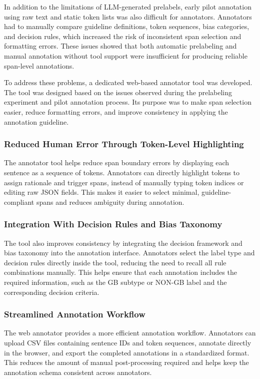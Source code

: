 \documentclass[12pt,oneside,openright,a4paper]{cpe-english-project}
\begin{document}
In addition to the limitations of LLM-generated prelabels, early pilot annotation using raw text and static token lists was also difficult for annotators. Annotators had to manually compare guideline definitions, token sequences, bias categories, and decision rules, which increased the risk of inconsistent span selection and formatting errors. These issues showed that both automatic prelabeling and manual annotation without tool support were insufficient for producing reliable span-level annotations.

To address these problems, a dedicated web-based annotator tool was developed. The tool was designed based on the issues observed during the prelabeling experiment and pilot annotation process. Its purpose was to make span selection easier, reduce formatting errors, and improve consistency in applying the annotation guideline.

\subsubsection{Reduced Human Error Through Token-Level Highlighting}

The annotator tool helps reduce span boundary errors by displaying each sentence as a sequence of tokens. Annotators can directly highlight tokens to assign rationale and trigger spans, instead of manually typing token indices or editing raw JSON fields. This makes it easier to select minimal, guideline-compliant spans and reduces ambiguity during annotation.

\subsubsection{Integration With Decision Rules and Bias Taxonomy}

The tool also improves consistency by integrating the decision framework and bias taxonomy into the annotation interface. Annotators select the label type and decision rules directly inside the tool, reducing the need to recall all rule combinations manually. This helps ensure that each annotation includes the required information, such as the GB subtype or NON-GB label and the corresponding decision criteria.

\subsubsection{Streamlined Annotation Workflow}

The web annotator provides a more efficient annotation workflow. Annotators can upload CSV files containing sentence IDs and token sequences, annotate directly in the browser, and export the completed annotations in a standardized format. This reduces the amount of manual post-processing required and helps keep the annotation schema consistent across annotators.
\end{document}

